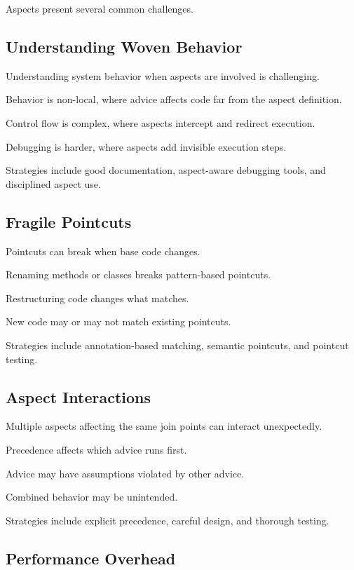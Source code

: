 \documentclass[11pt]{article}
\begin{document}
Aspects present several common challenges.

\subsection{Understanding Woven Behavior}

Understanding system behavior when aspects are involved is challenging.

Behavior is non-local, where advice affects code far from the aspect definition.

Control flow is complex, where aspects intercept and redirect execution.

Debugging is harder, where aspects add invisible execution steps.

Strategies include good documentation, aspect-aware debugging tools, and disciplined aspect use.

\subsection{Fragile Pointcuts}

Pointcuts can break when base code changes.

Renaming methods or classes breaks pattern-based pointcuts.

Restructuring code changes what matches.

New code may or may not match existing pointcuts.

Strategies include annotation-based matching, semantic pointcuts, and pointcut testing.

\subsection{Aspect Interactions}

Multiple aspects affecting the same join points can interact unexpectedly.

Precedence affects which advice runs first.

Advice may have assumptions violated by other advice.

Combined behavior may be unintended.

Strategies include explicit precedence, careful design, and thorough testing.

\subsection{Performance Overhead}
\end{document}
